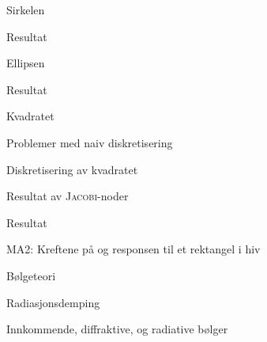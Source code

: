 \documentclass[gray]{beamer}
\begin{document}
\begin{frame}{Sirkelen}
  
\end{frame}
\begin{frame}{Resultat}
  
\end{frame}

\begin{frame}{Ellipsen}
  
\end{frame}
\begin{frame}{Resultat}
  
\end{frame}

\begin{frame}{Kvadratet}
  
\end{frame}

\begin{frame}{Problemer med naiv diskretisering}
  
\end{frame}

\begin{frame}{Diskretisering av kvadratet}
  
\end{frame}

\begin{frame}{Resultat av \textsc{Jacobi}-noder}
  
\end{frame}

\begin{frame}{Resultat}
  
\end{frame}

\begin{frame}{MA2: Kreftene på og responsen til et rektangel i hiv}
  
\end{frame}

\begin{frame}{Bølgeteori}
  
\end{frame}

\begin{frame}{Radiasjonsdemping}
  
\end{frame}

\begin{frame}{Innkommende, diffraktive, og radiative bølger}
  
\end{frame}
\end{document}
